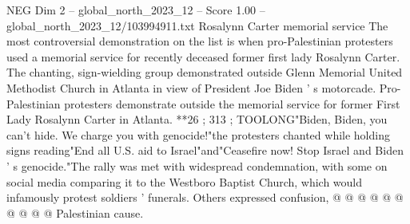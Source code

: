 \begin{textsample}{NEG Dim 2 – global\_north\_2023\_12 – Score 1.00 – global\_north\_2023\_12/103994911.txt}
Rosalynn Carter memorial service The most controversial demonstration on the list is when pro-Palestinian protesters used a memorial service for recently deceased former first lady Rosalynn Carter.
The chanting, sign-wielding group demonstrated outside Glenn Memorial United Methodist Church in Atlanta in view of President Joe Biden ' s motorcade.
Pro-Palestinian protesters demonstrate outside the memorial service for former First Lady Rosalynn Carter in Atlanta. **26 ; 313 ; TOOLONG"Biden, Biden, you can't hide.
We charge you with genocide!"the protesters chanted while holding signs reading"End all U.S. aid to Israel"and"Ceasefire now!
Stop Israel and Biden ' s genocide."The rally was met with widespread condemnation, with some on social media comparing it to the Westboro Baptist Church, which would infamously protest soldiers ' funerals.
Others expressed confusion, @ @ @ @ @ @ @ @ @ @ Palestinian cause.

\end{textsample}
